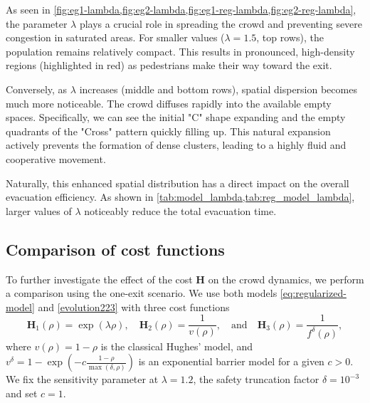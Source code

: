 \documentclass[final,reqno]{amsart}
\theoremstyle{plain}
\theoremstyle{definition}
\theoremstyle{remark}
\numberwithin{remark}{section}	%
\numberwithin{example}{section}	%
\newcommand{\he}{\mathbf{H}}
\begin{document}
As seen in \cref{fig:eg1-lambda,fig:eg2-lambda,fig:eg1-reg-lambda,fig:eg2-reg-lambda}, the parameter $\lambda$ plays a crucial role in spreading the crowd and preventing severe congestion in saturated areas. For smaller values ($\lambda = 1.5$, top rows), the population remains relatively compact. This results in pronounced, high-density regions (highlighted in red) as pedestrians make their way toward the exit.

Conversely, as $\lambda$ increases (middle and bottom rows), spatial dispersion becomes much more noticeable. The crowd diffuses rapidly into the available empty spaces. Specifically, we can see the initial "C" shape expanding and the empty quadrants of the "Cross" pattern quickly filling up. This natural expansion actively prevents the formation of dense clusters, leading to a highly fluid and cooperative movement.

Naturally, this enhanced spatial distribution has a direct impact on the overall evacuation efficiency. As shown in \cref{tab:model_lambda,tab:reg_model_lambda}, larger values of $\lambda$ noticeably reduce the total evacuation time.
\subsection{Comparison of cost functions}\label{subsection:comp_H}
To further investigate the effect of the cost $\he$ on the crowd dynamics, we perform a comparison using the one-exit scenario. We use  both models \eqref{eq:regularized-model} and \eqref{evolution223} with three cost functions
\begin{equation}
	\he_1(\rho) = \exp(\lambda \rho),\quad \he_2(\rho) = \frac{1}{v(\rho)},\quad\mbox{and}\quad\he_{3}(\rho) = \frac{1}{f^{\delta}(\rho)},
\end{equation}
where $v(\rho) = 1-\rho$ is the classical Hughes' model, and $v^{\delta} = 1- \exp\left(-c\frac{1-\rho}{\max(\delta,\rho)}\right)$ is an exponential barrier model for a given $c>0$. We fix the sensitivity parameter at $\lambda = 1.2$,  the safety truncation factor $\delta = 10^{-3}$ and set $c=1$.
\end{document}
